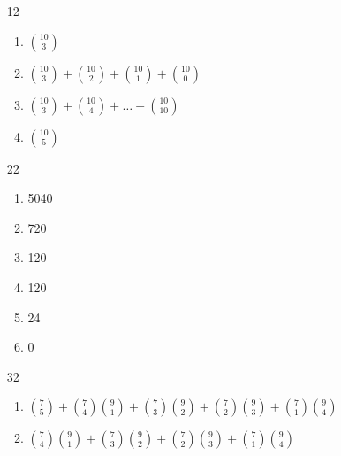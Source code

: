 \documentclass{article}
\begin{document}
\begin{enumerate}
  \item[12]
    \begin{enumerate}
      \item ${10 \choose 3}$
      \item ${10 \choose 3} + {10 \choose 2} + {10 \choose 1} + {10 \choose 0}$
      \item ${10 \choose 3} + {10 \choose 4} + \dots + {10 \choose 10}$
      \item ${10 \choose 5}$
    \end{enumerate}
  \item[22]
    \begin{enumerate}
      \item 5040
      \item 720
      \item 120
      \item 120
      \item 24
      \item 0
    \end{enumerate}
  \item[32]
    \begin{enumerate}
      \item ${7 \choose 5} + {7 \choose 4}{9 \choose 1} +
        {7 \choose 3}{9 \choose 2} +
        {7 \choose 2}{9 \choose 3} +
        {7 \choose 1}{9 \choose 4}$
      \item ${7 \choose 4}{9 \choose 1} +
        {7 \choose 3}{9 \choose 2} +
        {7 \choose 2}{9 \choose 3} +
        {7 \choose 1}{9 \choose 4}$

\end{enumerate}
\end{enumerate}
\end{document}
